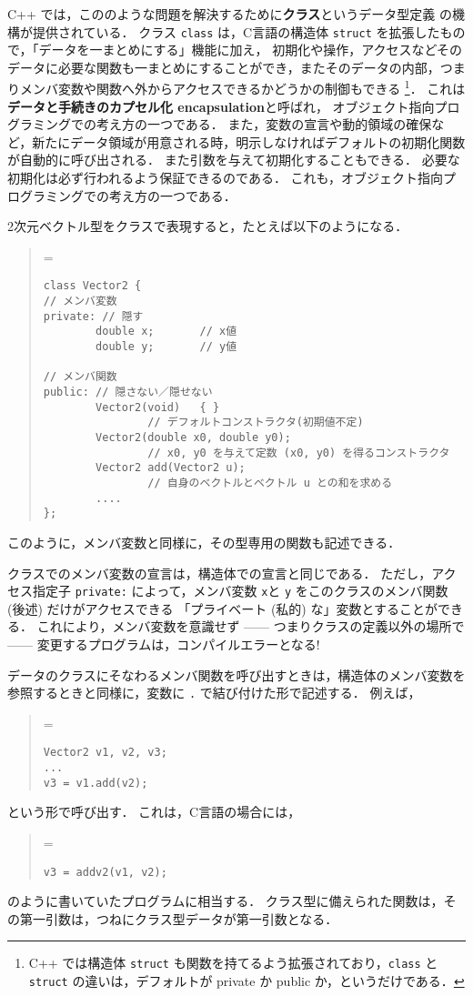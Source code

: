 \documentclass[11pt,a4,epsf]{jarticle}
\def\linesparpage#1{\baselineskip=\textheight\divide\baselineskip#1}
\begin{document}
C++ では，こののような問題を解決するために{\bf クラス}というデータ型定義
の機構が提供されている．
クラス \verb+class+ は，C言語の構造体 \verb+struct+ を拡張したもので，「データを一まとめにする」機能に加え，
初期化や操作，アクセスなどそのデータに必要な関数も一まとめにすることができ，またそのデータの内部，つまりメンバ変数や関数へ外からアクセスできるかどうかの制御もできる
\footnote{ C++ では構造体 {\tt struct} も関数を持てるよう拡張されており，{\tt class} と {\tt struct} の違いは，デフォルトが private か public か，というだけである．}．
これは{\bf データと手続きのカプセル化 encapsulation}と呼ばれ，
オブジェクト指向プログラミングでの考え方の一つである．
また，変数の宣言や動的領域の確保など，新たにデータ領域が用意される時，明示しなければデフォルトの初期化関数が自動的に呼び出される．
また引数を与えて初期化することもできる．
必要な初期化は必ず行われるよう保証できるのである．
これも，オブジェクト指向プログラミングでの考え方の一つである．

2次元ベクトル型をクラスで表現すると，たとえば以下のようになる．
\begin{quote}
\linesparpage{50}
\begin{verbatim}
class Vector2 {
// メンバ変数
private: // 隠す
        double x;       // x値
        double y;       // y値

// メンバ関数
public: // 隠さない／隠せない
        Vector2(void)   { }
                // デフォルトコンストラクタ(初期値不定)
        Vector2(double x0, double y0);
                // x0, y0 を与えて定数 (x0, y0) を得るコンストラクタ
        Vector2 add(Vector2 u);
                // 自身のベクトルとベクトル u との和を求める
        ....
};
\end{verbatim}
\end{quote}
このように，メンバ変数と同様に，その型専用の関数も記述できる．

クラスでのメンバ変数の宣言は，構造体での宣言と同じである．
ただし，アクセス指定子 \verb+private:+ によって，メンバ変数 \verb+x+と
\verb+y+ をこのクラスのメンバ関数 (後述) だけがアクセスできる
「プライベート (私的) な」変数とすることができる．
これにより，メンバ変数を意識せず ------ 
つまりクラスの定義以外の場所で ------ 変更するプログラムは，コンパイルエラーとなる!

データのクラスにそなわるメンバ関数を呼び出すときは，構造体のメンバ変数を参照するときと同様に，変数に \verb+.+ で結び付けた形で記述する．
例えば，
\begin{quote}
\linesparpage{50}
\begin{verbatim}
Vector2 v1, v2, v3;
...
v3 = v1.add(v2);
\end{verbatim}
\end{quote}
という形で呼び出す．
これは，C言語の場合には，
\begin{quote}
\linesparpage{50}
\begin{verbatim}
v3 = addv2(v1, v2);
\end{verbatim}
\end{quote}
のように書いていたプログラムに相当する．
クラス型に備えられた関数は，その第一引数は，つねにクラス型データが第一引数となる．
\end{document}
